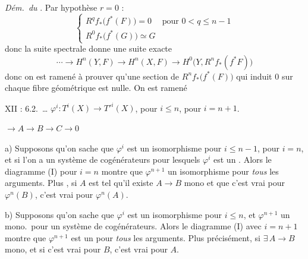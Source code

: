 \documentclass[11pt,a4paper]{article}
\begin{document}
\emph{Dém.\ du} . Par hypothèse
$r = 0$ :
\[
  \begin{cases}
    R^{q} f_{*}\bigl( f^{*}(F) \bigr) = 0 & \text{pour } 0 < q \leqslant n-1 \\
    R^{0} f_{*}\bigl( f^{*}(G) \bigr) \simeq G &
  \end{cases}
\]
donc la suite spectrale donne une suite exacte
\[
  \cdots \longrightarrow H^{n}(Y, F) \longrightarrow H^{n}(X, F)
  \longrightarrow H^{0}\bigl( Y, R^{n} f_{*}(f^{*}F) \bigr)
\]
donc on est ramené à prouver qu'une section de
$R^{n} f_{*}\bigl( f^{*}(F) \bigr)$ qui induit $0$ sur chaque fibre
géométrique est nulle. On est ramené

XII : 6.2.\ \ldots{} \quad
$\varphi^{i} : T^{i}(X) \to T'^{i}(X)$, \struck{\ill{}} \ill{} pour
$i \leqslant n$, \ill{} pour $i = n+1$.

$\longrightarrow A \to B \to C \to 0$


a) Supposons qu'on sache que $\varphi^{i}$ est un isomorphisme pour
$i \leqslant n-1$, \ill{} pour $i = n$, et si l'on a un système de
cogénérateurs pour lesquels \ill{} $\varphi^{i}$ est un \ill{}. Alors le
diagramme (I) pour $i = n$ montre que $\varphi^{n+1}$ \ill{} un isomorphisme
pour \emph{tous} les arguments. Plus , si $A$ est tel
qu'il existe $A \to B$ mono et que c'est vrai pour $\varphi^{n}(B)$, c'est
vrai pour $\varphi^{n}(A)$.

b) Supposons qu'on sache que $\varphi^{i}$ est un isomorphisme pour
$i \leqslant n$, et $\varphi^{n+1}$ un mono.\ pour un système de
cogénérateurs. Alors le diagramme (I) avec $i = n+1$ montre que
$\varphi^{n+1}$ est un \ill{} pour \emph{tous} les arguments. Plus
précisément, si $\exists\, A \to B$ mono, et si c'est vrai pour $B$, c'est
vrai pour $A$.
\end{document}
